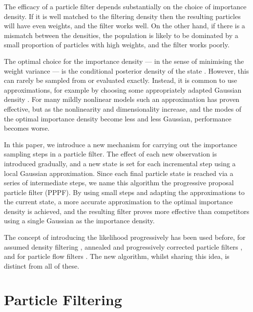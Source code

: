 \documentclass[conference]{IEEEtran}
\begin{document}
The efficacy of a particle filter depends substantially on the choice of importance density. If it is well matched to the filtering density then the resulting particles will have even weights, and the filter works well. On the other hand, if there is a mismatch between the densities, the population is likely to be dominated by a small proportion of particles with high weights, and the filter works poorly.

The optimal choice for the importance density --- in the sense of minimising the weight variance --- is the conditional posterior density of the state \cite{Doucet2000a}. However, this can rarely be sampled from or evaluated exactly. Instead, it is common to use approximations, for example by choosing some appropriately adapted Gaussian density \cite{Doucet2000a,Merwe2000}. For many mildly nonlinear models such an approximation has proven effective, but as the nonlinearity and dimensionality increase, and the modes of the optimal importance density become less and less Gaussian, performance becomes worse.

In this paper, we introduce a new mechanism for carrying out the importance sampling steps in a particle filter. The effect of each new observation is introduced gradually, and a new state is set for each incremental step using a local Gaussian approximation. Since each final particle state is reached via a series of intermediate steps, we name this algorithm the progressive proposal particle filter (PPPF). By using small steps and adapting the approximations to the current state, a more accurate approximation to the optimal importance density is achieved, and the resulting filter proves more effective than competitors using a single Gaussian as the importance density.

The concept of introducing the likelihood progressively has been used before, for assumed density filtering \cite{Hanebeck2003,Hagmar2011}, annealed and progressively corrected particle filters \cite{Godsill2001b,Gall2007,Deutscher2000,Oudjane2000}, and for particle flow filters \cite{Daum2011d}. The new algorithm, whilst sharing this idea, is distinct from all of these.



\section{Particle Filtering}
\end{document}
